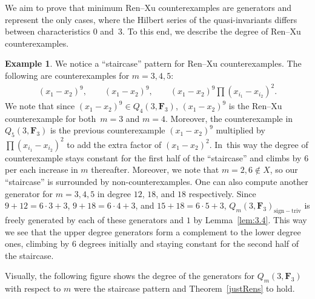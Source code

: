 \documentclass[11pt]{article}
\numberwithin{equation}{section}
\theoremstyle{definition}
\newtheorem{Example}[Theorem]{Example}
\numberwithin{equation}{section}
\newcommand{\siv}{\mathrm{sign-triv}}
\begin{document}
We aim to prove that minimum Ren--Xu counterexamples are generators and represent the only cases, where the Hilbert series of the quasi-invariants differs between characteristics $0$ and~$3$. To this end, we describe the degree of Ren--Xu counterexamples.

\begin{Example}
 We notice a ``staircase'' pattern for Ren--Xu counterexamples. The following are counterexamples for $m=3,4,5$:
 \begin{gather*}
 (x_1-x_2)^9, \qquad (x_1-x_2)^9,\qquad
 (x_1-x_2)^9\prod (x_{i_1}-x_{i_2})^2.
 \end{gather*}
 We note that since $(x_1-x_2)^9\in Q_4(3,\mathbf{F}_3)$, $(x_1-x_2)^9$ is the Ren--Xu counterexample for both~${m=3}$ and $m=4$. Moreover, the counterexample in $Q_5(3,\mathbf{F}_3)$ is the previous counterexample $(x_1-x_2)^9$ multiplied by $\prod (x_{i_1}-x_{i_2})^2$ to add the extra factor of $(x_1-x_2)^2$. In~this way the degree of counterexample stays constant for the first half of the ``staircase'' and climbs by $6$ per each increase in $m$ thereafter. Moreover, we note that $m=2,6\not\in X$, so our ``staircase'' is surrounded by non-counterexamples. One can also compute another generator for $m=3, 4, 5$ in degree $12$, $18$, and $18$ respectively. Since $9+12=6\cdot 3+3$, $9+18=6\cdot 4+3$, and $15+18=6\cdot 5 +3$, $Q_m(3,\mathbf{F}_3)_{\siv}$ is freely generated by each of these generators and $1$ by Lemma~\ref{lem:3.4}. This way we see that the upper degree generators form a complement to the lower degree ones, climbing by $6$ degrees initially and staying constant for the second half of the staircase.

 Visually, the following figure shows the degree of the generators for $Q_m(3,\mathbf{F}_3)$ with respect to $m$ were the staircase pattern and Theorem~\ref{justRens} to hold.
 \begin{figure}[ht]%
 \centering
\end{figure}
\end{Example}
\end{document}
